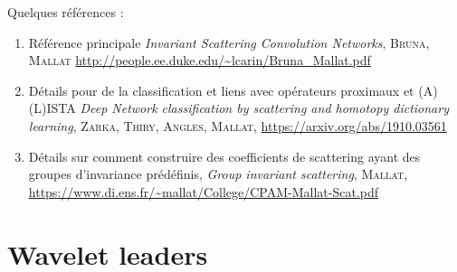 \documentclass[11pt]{article} %
\begin{document}
Quelques références :
\begin{enumerate}
	\item  Référence principale \emph{Invariant Scattering Convolution Networks}, \textsc{Bruna, Mallat} \url{http://people.ee.duke.edu/~lcarin/Bruna_Mallat.pdf}
	\item Détails pour de la classification et liens avec opérateurs proximaux et (A)(L)ISTA \emph{Deep Network classification by scattering and homotopy dictionary learning}, \textsc{Zarka, Thiry, Angles, Mallat}, \url{https://arxiv.org/abs/1910.03561}
	\item Détails sur comment construire des coefficients de scattering ayant des groupes d'invariance prédéfinis, \emph{Group invariant scattering}, \textsc{Mallat}, \url{https://www.di.ens.fr/~mallat/College/CPAM-Mallat-Scat.pdf}
\end{enumerate}

\section{Wavelet leaders}
\end{document}
